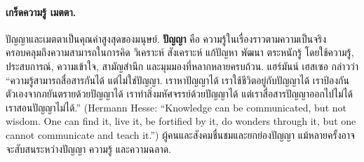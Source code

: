 {\small
	\begin{shaded}
		\paragraph{\small เกร็ดความรู้ เมตตา.}
				
		\begin{Parallel}[c]{0.48\textwidth}{0.38\textwidth}
		\end{Parallel}
		\vspace{0.5cm}
						
		ปัญญาและเมตตาเป็นคุณค่าสูงสุดของมนุษย์.
		\textbf{ปัญญา} คือ ความรู้ในเรื่องราวตามความเป็นจริง ครอบคลุมถึงความสามารถในการคิด วิเคราะห์ สังเคราะห์ แก้ปัญหา พัฒนา ตระหนักรู้ โดยใช้ความรู้, ประสบการณ์, ความเข้าใจ, สามัญสำนึก และมุมมองที่หลากหลายครบถ้วน.
		แฮร์มันน์ เฮสเซอ กล่าวว่า ``ความรู้สามารถสื่อสารกันได้ แต่ไม่ใช่ปัญญา. 
		เราหาปัญญาได้ เราใช้ชีวิตอยู่กับปัญญาได้ เราป้องกันตัวเองจากภยันตรายด้วยปัญญาได้
		เราทำสิ่งมหัศจรรย์ด้วยปัญญาได้ แต่เราสื่อสารปัญญาออกไปไม่ได้ เราสอนปัญญาไม่ได้.''
		(Hermann Hesse: ``Knowledge can be communicated, but not wisdom. One can find it, live it, 
		be fortified by it, do wonders through it, but one cannot communicate and teach it.'')
		ผู้คนและสังคมชื่นชมและยกย่องปัญญา แม้หลายครั้งอาจจะสับสนระหว่างปัญญา ความรู้ และความฉลาด.
		

\end{shaded}}
